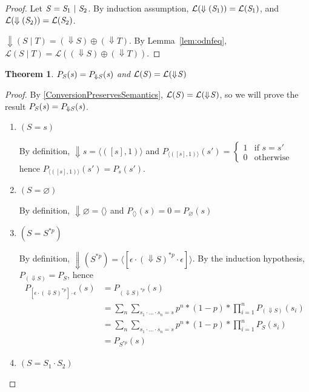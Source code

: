 \documentclass[acmsmall,screen,anonymous]{acmart}
\newtheorem*{theorem*}{Theorem}
\begin{document}
\begin{proof}
  Let $\mathit{S}=\mathit{S}_1~|~\mathit{S}_2$.
  By induction assumption,
  $\mathcal{L}(\Downarrow(\mathit{S}_1))=\mathcal{L}(\mathit{S}_1)$, and
  $\mathcal{L}(\Downarrow(\mathit{S}_2))=\mathcal{L}(\mathit{S}_2)$.

  $\Downarrow(S \; | \; T) = (\Downarrow S) \oplus (\Downarrow T)$. By Lemma~\ref{lem:odnfeq},
  $\mathcal{L}(S \; | \; T) = \mathcal{L}((\Downarrow S) \oplus (\Downarrow T))$.
  
\end{proof}
\begin{theorem*}
  $P_{\mathit{S}}(\mathit{s}) = P_{\Downarrow
    \mathit{S}}(\mathit{s})$ and $\mathcal{L}(\mathit{S}) =
  \mathcal{L}(\Downarrow\mkern-4mu \mathit{S})$
\end{theorem*}
\begin{proof}
By \cref{ConversionPreservesSemantics}, $\mathcal{L}(\mathit{S}) =
  \mathcal{L}(\Downarrow\mkern-4mu \mathit{S})$, so we will prove the result $P_{\mathit{S}}(\mathit{s}) = P_{\Downarrow
    \mathit{S}}(\mathit{s})$.
\begin{enumerate}
\item
$(S = s)$

By definition, $\Downarrow s = \langle ([s],1) \rangle$ and $P_{\langle ([s], 1) \rangle}(s') = 
\begin{cases}
1 & \text{if } s = s'\\
0 & \text{otherwise}
\end{cases}$ hence $P_{\langle ([s],1) \rangle}(s') = P_s(s')$.
\item
$(S = \varnothing)$

By definition, $\Downarrow \varnothing = \langle \rangle$ and $P_{\langle \rangle}(s) = 0 = P_{\varnothing}(s)$
\item
$(S = S^{*p})$

By definition, $\Downarrow (S^{*p}) = \langle [\epsilon \cdot (\Downarrow S)^{*p} \cdot \epsilon] \rangle $. By the induction hypothesis, $P_{(\Downarrow S)} = P_{S}$, hence
\begin{align*}
P_{[\epsilon \cdot (\Downarrow S)^{*p}] \cdot \epsilon}(s) &= P_{(\Downarrow S)^{*p}}(s)\\
&= \sum_n \sum_{s_1 \cdot \ldots \cdot s_n=s} p^n * (1-p) * \prod_{i=1}^n P_{(\Downarrow S)}(s_i)\\
&= \sum_n \sum_{s_1 \cdot \ldots \cdot s_n=s} p^n * (1-p) * \prod_{i=1}^n P_{S}(s_i)\\
&= P_{S^{*p}}(s)
\end{align*}
\item
$(S = S_1 \cdot S_2)$


\end{enumerate}
\end{proof}
\end{document}

